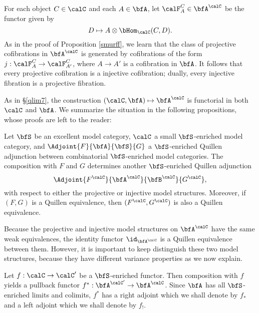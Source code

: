 \begin{Simplicial Categories}

\begin{remark}\label{postsmurf}
For each object $C \in \calC$ and each $A \in \bfA$, let
$\calF^{C}_{A} \in \bfA^{\calC}$ be the functor given by
$$D \mapsto A \otimes \bHom_{\calC}(C,D).$$
As in the proof of Proposition \ref{smurff}, we learn that the
class of projective cofibrations in $\bfA^{\calC}$ is generated by
cofibrations of the form $j: \calF^{C}_{A} \rightarrow \calF^{C}_{A'}$, where
$A \rightarrow A'$ is a cofibration in $\bfA$. It follows that every projective cofibration is a injective cofibration; dually, every injective fibration is a projective fibration.
\end{remark}

As in \S \ref{qlim7}, the construction $(\calC, \bfA) \mapsto \bfA^{\calC}$ is functorial
in both $\calC$ and $\bfA$. We summarize the situation in the following
propositions, whose proofs are left to the reader:

\begin{proposition}
Let $\bfS$ be an excellent model category, $\calC$ a small $\bfS$-enriched model category, and
$\Adjoint{F}{\bfA}{\bfS}{G}$ a $\bfS$-enriched Quillen adjunction between
combinatorial $\bfS$-enriched model categories. The composition with $F$ and $G$
determines another $\bfS$-enriched Quillen adjunction
$$ \Adjoint{ F^{\calC} }{ \bfA^{\calC} }{ \bfB^{\calC} }{G^{\calC} },$$
with respect to either the projective or injective model structures.
Moreover, if $(F,G)$ is a Quillen equivalence, then $(F^{\calC}, G^{\calC})$ is also a Quillen equivalence.
\end{proposition}

Because the projective and injective model structures on
$\bfA^{\calC}$ have the same weak equivalences, the identity
functor $\id_{ \bfA^{\calC}}$ is a Quillen equivalence between them. However, it is
important to keep distinguish these two model structures, because
they have different variance properties as we now explain.

Let $f: \calC \rightarrow \calC'$ be a $\bfS$-enriched functor. Then
composition with $f$ yields a pullback functor $f^{\ast}:
\bfA^{\calC'} \rightarrow \bfA^{\calC}$. Since $\bfA$ has all
$\bfS$-enriched limits and colimits, $f^{\ast}$ has a
right adjoint which we shall denote by $f_{\ast}$ and a left
adjoint which we shall denote by $f_{!}$.


\end{Simplicial Categories}
